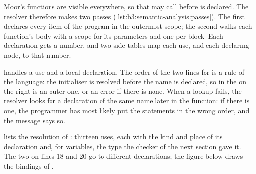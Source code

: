 Moor's functions are visible everywhere, so that  may call  before  is declared. The resolver therefore makes two passes (\cref{lst:b3:semantic-analysis:passes}). The first declares every item of the program in the outermost scope; the second walks each function's body with a scope for its parameters and one per block. Each declaration gets a number, and two side tables map each use, and each declaring node, to that number.

\label{lst:b3:semantic-analysis:passes}

 handles a use and a local declaration. The order of the two lines for  is a rule of the language: the initialiser is resolved before the name is declared, so in  the  on the right is an outer one, or an error if there is none. When a lookup fails, the resolver looks for a declaration of the same name later in the function: if there is one, the programmer has most likely put the statements in the wrong order, and the message says so.

\label{lst:b3:semantic-analysis:use}

 lists the resolution of : thirteen uses, each with the kind and place of its declaration and, for variables, the type the checker of the next section gave it. The two  on lines 18 and 20 go to different declarations; the figure below draws the bindings of .

\label{out:b3:semantic-analysis:check}

